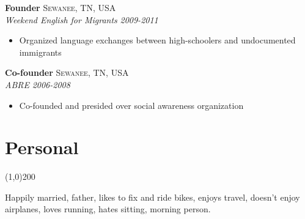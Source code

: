 \documentclass[11pt]{article}
\begin{document}
\noindent \textbf{Founder} \hfill \textsc{Sewanee, TN, USA}\\
\noindent \emph{Weekend English for Migrants} \hfill \emph{2009-2011}
\vspace{-2mm}
\begin{itemize}\itemsep0pt \parskip0pt 
\item Organized language exchanges between high-schoolers and undocumented immigrants
\end{itemize}


\noindent \textbf{Co-founder} \hfill \textsc{Sewanee, TN, USA}\\
\noindent \emph{ABRE} \hfill \emph{2006-2008}
\vspace{-2mm}
\begin{itemize}\itemsep0pt \parskip0pt 
\item Co-founded and presided over social awareness organization
\end{itemize}






\section*{Personal} %
\vspace{-7mm}
\line(1,0){200}
\vspace{2mm}

\noindent Happily married, father, likes to fix and ride bikes, enjoys travel, doesn't enjoy airplanes, loves running, hates sitting, morning person.
\end{document}
